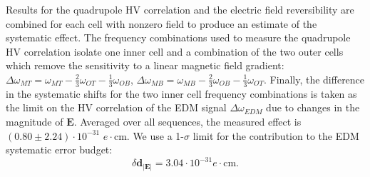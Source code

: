 \documentclass [10pt, twoside] {uwthesis}[2012/04/02]
\begin{document}
Results for the quadrupole HV correlation and the electric field reversibility are combined for each cell with nonzero field to produce an estimate of the systematic effect. The frequency combinations used to measure the quadrupole HV correlation isolate one inner cell and a combination of the two outer cells which remove the sensitivity to a linear magnetic field gradient: $\Delta\omega_{MT} = \omega_{MT} - \frac{2}{3}\omega_{OT} - \frac{1}{3}\omega_{OB}$, $\Delta\omega_{MB} = \omega_{MB} - \frac{2}{3}\omega_{OB} - \frac{1}{3}\omega_{OT}$. Finally, the difference in the systematic shifts for the two inner cell frequency combinations is taken as the limit on the HV correlation of the EDM signal $\Delta\omega_{EDM}$ due to changes in the magnitude of $\mathbf{E}$. Averaged over all sequences, the measured effect is $(0.80 \pm 2.24) \cdot 10^{-31}$ $e \cdot \text{cm}$. We use a 1-$\sigma$ limit for the contribution to the EDM systematic error budget: 
\begin{equation}
\delta\mathbf{d}_{|\mathbf{E}|} = 3.04 \cdot 10^{-31} e \cdot \text{cm}.  
\end{equation}
\end{document}
